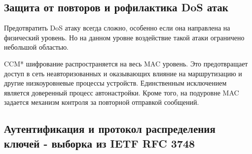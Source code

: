 \subsection{Защита от повторов и рофилактика DoS атак}

Предотвратить DoS атаку всегда сложно, особенно если она направлена на физический уровень. Но на данном уровне воздействие такой атаки ограничено небольшой областью.

CCM* шифрование распространяется на весь MAC уровень. Это предотвращает доступ в сеть неавторизованных и оказывающих влияние на маршрутизацию и другие низкоуровневые процессы устройств. Единственным исключением является доверенный процесс автонастройки. Кроме того, на подуровне MAC задается механизм контроля за повторной отправкой сообщений.

\subsection{Аутентификация и протокол распределения ключей - выборка из IETF RFC 3748}

